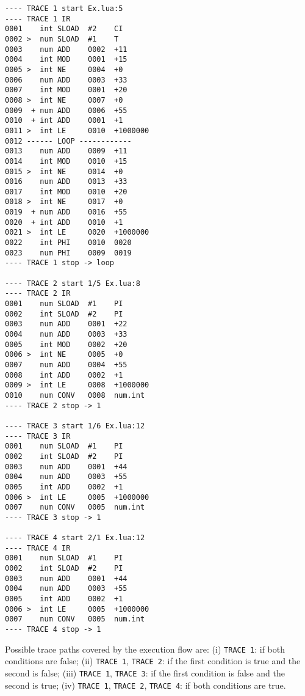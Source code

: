 \begin{multicols}{2}
\begin{lstlisting}[style=DumpStyle]
---- TRACE 1 start Ex.lua:5
---- TRACE 1 IR
0001    int SLOAD  #2    CI
0002 >  num SLOAD  #1    T
0003    num ADD    0002  +11 
0004    int MOD    0001  +15 
0005 >  int NE     0004  +0  
0006    num ADD    0003  +33 
0007    int MOD    0001  +20 
0008 >  int NE     0007  +0  
0009  + num ADD    0006  +55 
0010  + int ADD    0001  +1  
0011 >  int LE     0010  +1000000
0012 ------ LOOP ------------
0013    num ADD    0009  +11 
0014    int MOD    0010  +15 
0015 >  int NE     0014  +0  
0016    num ADD    0013  +33 
0017    int MOD    0010  +20 
0018 >  int NE     0017  +0  
0019  + num ADD    0016  +55 
0020  + int ADD    0010  +1  
0021 >  int LE     0020  +1000000
0022    int PHI    0010  0020
0023    num PHI    0009  0019
---- TRACE 1 stop -> loop

---- TRACE 2 start 1/5 Ex.lua:8
---- TRACE 2 IR
0001    num SLOAD  #1    PI
0002    int SLOAD  #2    PI
0003    num ADD    0001  +22 
0004    num ADD    0003  +33 
0005    int MOD    0002  +20 
0006 >  int NE     0005  +0  
0007    num ADD    0004  +55 
0008    int ADD    0002  +1  
0009 >  int LE     0008  +1000000
0010    num CONV   0008  num.int
---- TRACE 2 stop -> 1

---- TRACE 3 start 1/6 Ex.lua:12
---- TRACE 3 IR
0001    num SLOAD  #1    PI
0002    int SLOAD  #2    PI
0003    num ADD    0001  +44 
0004    num ADD    0003  +55 
0005    int ADD    0002  +1  
0006 >  int LE     0005  +1000000
0007    num CONV   0005  num.int
---- TRACE 3 stop -> 1

---- TRACE 4 start 2/1 Ex.lua:12
---- TRACE 4 IR
0001    num SLOAD  #1    PI
0002    int SLOAD  #2    PI
0003    num ADD    0001  +44 
0004    num ADD    0003  +55 
0005    int ADD    0002  +1  
0006 >  int LE     0005  +1000000
0007    num CONV   0005  num.int
---- TRACE 4 stop -> 1
\end{lstlisting}
\end{multicols}

\noindent
Possible trace paths covered by the execution flow are: (i) \texttt{TRACE 1}: if both conditions are false; (ii) \texttt{TRACE 1}, \texttt{TRACE 2}: if the first condition is true and the second is false; (iii) \texttt{TRACE 1}, \texttt{TRACE 3}: if the first condition is false and the second is true; (iv) \texttt{TRACE 1}, \texttt{TRACE 2}, \texttt{TRACE 4}: if both conditions are true.

